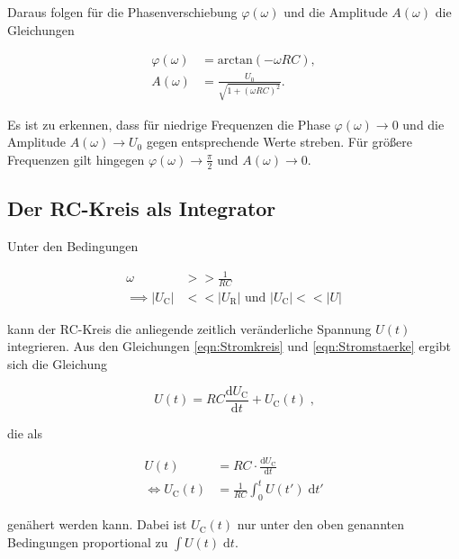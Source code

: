 Daraus folgen für die Phasenverschiebung $\varphi(\omega)$ und die Amplitude $A(\omega)$
die Gleichungen

\begin{align*}
    \varphi(\omega) &= \text{arctan}(- \omega RC), \\
    A(\omega) &= \frac{U_0}{\sqrt{1 + (\omega RC)^2}}.
\end{align*}

Es ist zu erkennen, dass für niedrige Frequenzen die Phase $\varphi(\omega) \to 0$ und
die Amplitude $A(\omega) \to U_0$ gegen entsprechende Werte streben. Für größere
Frequenzen gilt hingegen $\varphi(\omega) \to \frac{\pi}{2}$ und $A(\omega) \to 0$.

\subsection{Der RC-Kreis als Integrator}

Unter den Bedingungen 

\begin{align*}
    \omega &>> \frac{1}{RC} \\
    \implies |U_\text{C}| &<< |U_\text{R}| \text{  und  } |U_\text{C}| << |U|
\end{align*}

kann der RC-Kreis die anliegende zeitlich veränderliche Spannung $U(t)$ integrieren.
Aus den Gleichungen \eqref{eqn:Stromkreis} und \eqref{eqn:Stromstaerke} ergibt sich die
Gleichung 

\begin{equation*}
    U(t) = RC \frac{\text{d}U_\text{C}}{\text{d}t} + U_\text{C}(t) \; \text{,}
\end{equation*}

die als

\begin{align*}
    U(t) &= RC \cdot \frac{\text{d}U_\text{C}}{\text{d}t} \\
    \iff U_\text{C}(t) &= \frac{1}{RC} \int^t_0 U(t') \; \text{d} t'
\end{align*}

genähert werden kann. Dabei ist $U_\text{C}(t)$ nur unter den oben genannten Bedingungen
proportional zu $\int U(t) \; \text{d}t$.

